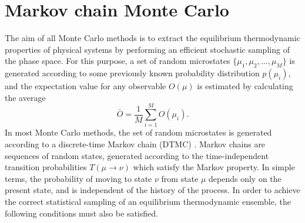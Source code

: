 \documentclass[12pt]{report}
\begin{document}
\section{Markov chain Monte Carlo}
The aim of all Monte Carlo methods is to extract the equilibrium thermodynamic properties of physical systems by performing an efficient stochastic sampling of the phase space. For this purpose, a set of random microstates $\{\mu_{1},\mu_{2},...,\mu_{M}\}$ is generated according to some previously known probability distribution $p(\mu_{i})$, and the expectation value for any observable $O({\mu})$ is estimated by calculating the average
%
\begin{equation}
\label{eq:expectationValue}
\bar{O} = \frac{1}{M}\sum_{i = 1}^{M} O(\mu_{i}).
\end{equation}
%
In most Monte Carlo methods, the set of random microstates is generated according to a discrete-time Markov chain (DTMC) \cite{Resnick2005}. Markov chains are sequences of random states, generated according to the time-independent transition probabilities $T(\mu \rightarrow \nu)$ which satisfy the Markov property. In simple terms, the probability of moving to state $\nu$ from state $\mu$ depends only on the present state, and is independent of the history of the process. In order to achieve the correct statistical sampling of an equilibrium thermodynamic ensemble, the following conditions must also be satisfied.
\end{document}
